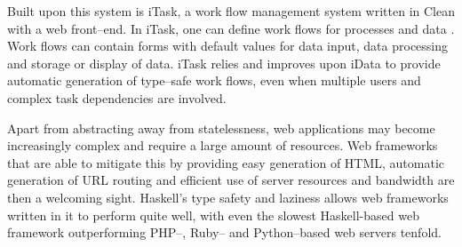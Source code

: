 Built upon this system is iTask, a work flow management system written in Clean with a web front--end.
In iTask, one can define work flows for processes and data \cite{itaskIntro}.
Work flows can contain forms with default values for data input, data processing and storage or display of data.
iTask relies and improves upon iData to provide automatic generation of type--safe work flows, even when multiple users and  complex task dependencies are involved.

Apart from abstracting away from statelessness, web applications may become increasingly complex and require a large amount of resources.
Web frameworks that are able to mitigate this by providing easy generation of HTML, automatic generation of URL routing and efficient use of server resources and bandwidth are then a welcoming sight.
Haskell's type safety and laziness allows web frameworks written in it to perform quite well, with even the slowest Haskell-based web framework outperforming PHP--, Ruby-- and Python--based web servers tenfold. \cite{warp}
